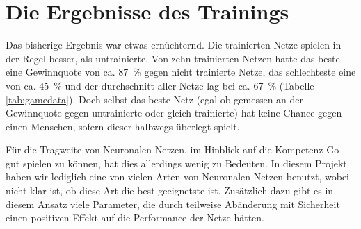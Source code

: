 \section{Die Ergebnisse des Trainings}
Das bisherige Ergebnis war etwas ernüchternd. Die trainierten Netze spielen in
der Regel besser, als untrainierte. Von zehn trainierten Netzen hatte das beste
eine Gewinnquote von ca. \SI{87}{\percent} gegen nicht trainierte Netze, das
schlechteste eine von ca. \SI{45}{\percent} und der durchschnitt aller Netze
lag bei ca. \SI{67}{\percent} (Tabelle \ref{tab:gamedata}).  
Doch selbst das beste Netz (egal ob gemessen an
der Gewinnquote gegen untrainierte oder gleich trainierte) hat keine Chance
gegen einen Menschen, sofern dieser halbwegs überlegt spielt.

Für die Tragweite von Neuronalen Netzen, im Hinblick auf die Kompetenz Go gut
spielen zu können, hat dies allerdings wenig zu Bedeuten. In diesem Projekt
haben wir lediglich eine von vielen Arten von Neuronalen Netzen benutzt, wobei
nicht klar ist, ob diese Art die best geeignetste ist. Zusätzlich dazu gibt es
in diesem Ansatz viele Parameter, die durch teilweise Abänderung mit Sicherheit
einen positiven Effekt auf die Performance der Netze hätten. 

